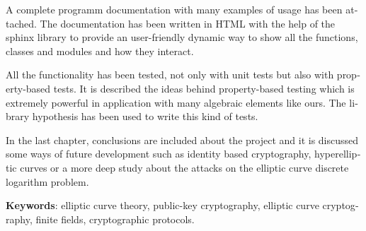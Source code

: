 \begin{otherlanguage}{american}
A complete programm documentation with many examples of usage has been attached. The documentation has been written in HTML with the help of the sphinx library to provide an user-friendly dynamic way to show all the functions, classes and modules and how they interact.

All the functionality has been tested, not only with unit tests but also with property-based tests. It is described the ideas behind property-based testing which is extremely powerful in application with many algebraic elements like ours. The library hypothesis has been used to write this kind of tests.

In the last chapter, conclusions are included about the project and it is discussed some ways of future development such as identity based cryptography, hyperelliptic curves or a more deep study about the attacks on the elliptic curve discrete logarithm problem.

\bigskip

\textbf{Keywords}: elliptic curve theory, public-key cryptography, elliptic curve cryptography, finite fields, cryptographic protocols.

\end{otherlanguage}

\endgroup

\vfill
